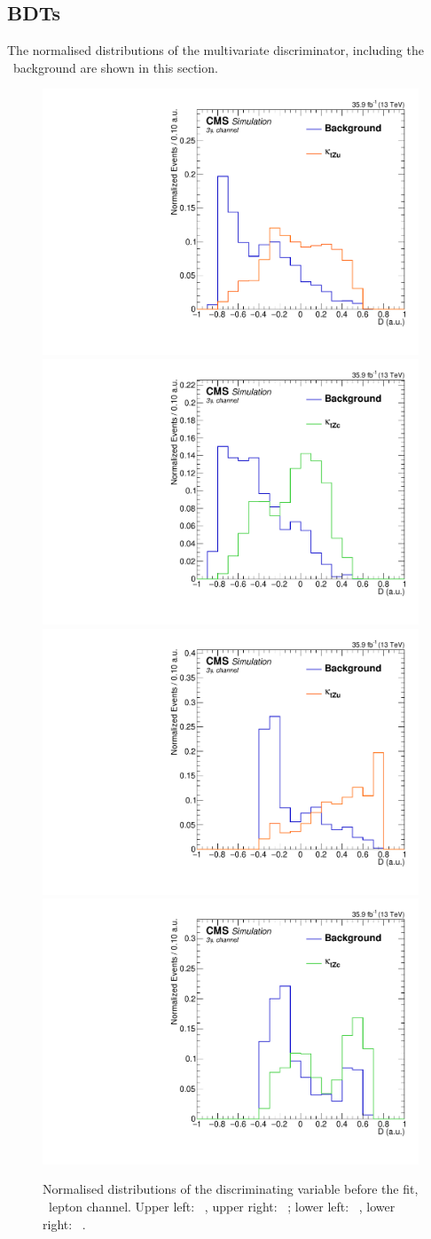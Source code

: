 \subsection{BDTs}
\label{sec:BDTs}
The normalised distributions of the multivariate discriminator, including the \NPL\ background are shown in this section. 
\begin{figure}[htbp]
	\centering
	\includegraphics[width=0.49\linewidth]{6_Search/Figures/BDTdistributionsNorm/toppair_Zut_BDT_uuu_Normalized}
	\includegraphics[width=0.49\linewidth]{6_Search/Figures/BDTdistributionsNorm/toppair_Zct_BDT_uuu_Normalized}
	\includegraphics[width=0.49\linewidth]{6_Search/Figures/BDTdistributionsNorm/singletop_Zut_BDT_uuu_Normalized}
	\includegraphics[width=0.49\linewidth]{6_Search/Figures/BDTdistributionsNorm/singletop_Zct_BDT_uuu_Normalized}
	\caption{Normalised distributions of the discriminating variable before the fit, \mumumu\ lepton channel. Upper left: \TTSR\ \Zut , upper right: \TTSR\ \Zct ; lower left: \STSR\  \Zut , lower right: \STSR\  \Zct .}
	\label{fig:bdtuuunorm}
\end{figure}	


